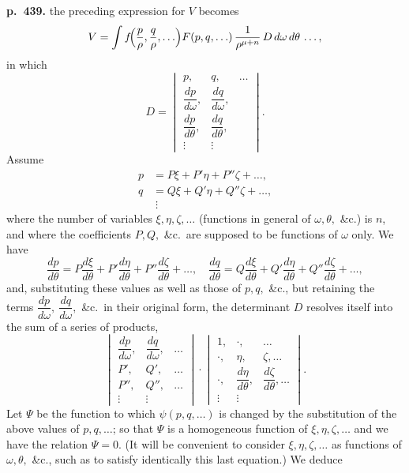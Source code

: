 \documentclass[11pt]{article}
\begin{document}
\bigskip
\noindent\textbf{p.~439.} the preceding expression for $V$ becomes
\[ V = \int f\!\Bigl(\frac{p}{\rho},\frac{q}{\rho},\ldots\Bigr) F(p, q, \ldots)\,\frac{1}{\rho^{\mu + n}}\,D\,d\omega\,d\theta\,\ldots, \]
in which
\[ D = \begin{vmatrix} p,&q,&\ldots\\[2pt] \dfrac{dp}{d\omega},&\dfrac{dq}{d\omega},&\\[6pt] \dfrac{dp}{d\theta},&\dfrac{dq}{d\theta},&\\ \vdots&\vdots& \end{vmatrix}. \]
Assume
\[
\begin{aligned}
p &= P\xi + P'\eta + P''\zeta + \ldots,\\
q &= Q\xi + Q'\eta + Q''\zeta + \ldots,\\
&\;\vdots
\end{aligned}
\]
where the number of variables $\xi, \eta, \zeta, \ldots$ (functions in general of $\omega, \theta,$ \&c.) is $n$, and where the coefficients $P, Q,$ \&c.\ are supposed to be functions of $\omega$ only. We have
\[ \frac{dp}{d\theta} = P\frac{d\xi}{d\theta} + P'\frac{d\eta}{d\theta} + P''\frac{d\zeta}{d\theta} + \ldots, \quad \frac{dq}{d\theta} = Q\frac{d\xi}{d\theta} + Q'\frac{d\eta}{d\theta} + Q''\frac{d\zeta}{d\theta} + \ldots, \]
and, substituting these values as well as those of $p, q,$ \&c., but retaining the terms $\dfrac{dp}{d\omega},\ \dfrac{dq}{d\omega},$ \&c.\ in their original form, the determinant $D$ resolves itself into the sum of a series of products,
\[ \begin{vmatrix} \dfrac{dp}{d\omega},&\dfrac{dq}{d\omega},&\ldots\\[6pt] P',&Q',&\ldots\\[2pt] P'',&Q'',&\ldots\\ \vdots&\vdots& \end{vmatrix} \cdot \begin{vmatrix} 1,&\cdot,&\ldots\\ \cdot,&\eta,&\zeta,\ldots\\[2pt] \cdot,&\dfrac{d\eta}{d\theta},&\dfrac{d\zeta}{d\theta},\ldots\\ \vdots&\vdots& \end{vmatrix}. \]
Let $\Psi$ be the function to which $\psi(p, q, \ldots)$ is changed by the substitution of the above values of $p, q, \ldots$; so that $\Psi$ is a homogeneous function of $\xi, \eta, \zeta, \ldots$ and we have the relation $\Psi = 0$. (It will be convenient to consider $\xi, \eta, \zeta, \ldots$ as functions of $\omega, \theta,$ \&c., such as to satisfy identically this last equation.) We deduce
\end{document}
